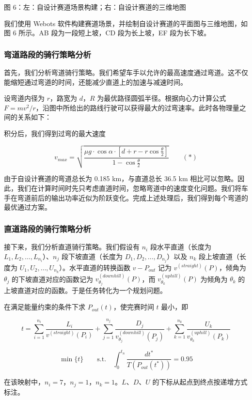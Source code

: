 \documentclass[11pt,a4paper]{ctexart}
\begin{document}
图 6：左：自设计赛道场景构建；右：自设计赛道的三维地图

我们使用 Webots 软件构建赛道场景，并绘制自设计赛道的平面图与三维地图，如图 6 所示。AB 段为一段短上坡，CD 段为长上坡，EF 段为长下坡。

\subsubsection{弯道路段的骑行策略分析}

首先，我们分析弯道骑行策略。我们希望车手以允许的最高速度通过弯道。这不仅能缩短通过弯道的时间，还能减少直道上的加速与减速时间。

设弯道内径为 $r$，路宽为 $d$，$R$ 为最优路径圆弧半径。根据向心力计算公式 $F=mv^{2}/r$，沿图中所给出的路线行驶可以获得最大的过弯速率。此时各物理量之间的关系如下：

积分后，我们得到过弯的最大速度

\[
v_{max}=\sqrt{\frac{\mu g\cdot\cos\alpha\cdot\left[d+r-r\cos\frac{\theta}{2}\right]}{1-\cos\frac{\theta}{2}}}\qquad(\ast)
\]

由于自设计赛道的弯道总长为 0.185 km，与直道总长 36.5 km 相比可以忽略。因此，我们在计算时间时先只考虑直道时间，忽略弯道中的速度变化问题。我们将车手在弯道前后的输出功率近似为阶跃变化。完成上述处理后，我们得到每个弯道的最优通过方案。

\subsubsection{直道路段的骑行策略分析}

接下来，我们分析直道骑行策略。我们假设有 $n_i$ 段水平直道（长度为 $L_1,L_2,\dots,L_{n_i}$）、$n_j$ 段下坡直道（长度为 $D_1,D_2,\dots,D_{n_j}$）以及 $n_k$ 段上坡直道（长度为 $U_1,U_2,\dots,U_{n_k}$）。水平直道的转换函数 $v-P_{out}$ 记为 $v^{(straight)}(P)$，倾角为 $\theta_j$ 的下坡直道对应的函数记为 $v^{(downhill)}_{\theta_j}(P)$，而 $v^{(uphill)}_{\theta_k}(P)$ 为倾角为 $\theta_k$ 的上坡直道对应的函数。于是任务转化为一个规划问题。

在满足能量约束的条件下求 $P_{out}(t)$，使完赛时间 $t$ 最小，即

\[
t=\sum_{i=1}^{n_i}\frac{L_i}{v^{(straight)}(P_i)}+\sum_{j=1}^{n_j}\frac{D_j}{v^{(downhill)}_{\theta_j}(P_j)}+\sum_{k=1}^{n_k}\frac{U_k}{v^{(uphill)}_{\theta_k}(P_k)}
\]

\[
\min\{t\}\qquad\mathrm{s.t.}\quad\int_0^{t_n}\frac{dt^{\ast}}{T\left(P_{out}(t^{\ast})\right)}=0.95
\]

在该映射中，$n_i=7$，$n_j=1$，$n_k=1$。$L$、$D$、$U$ 的下标从起点到终点按递增方式标注。
\end{document}

